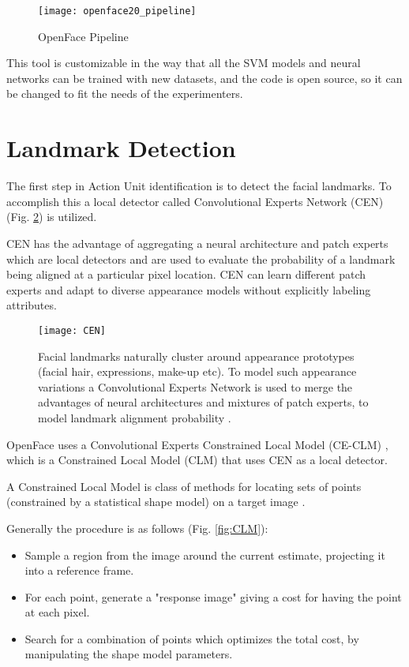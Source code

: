 \begin{figure}[H]
	\centering
	\texttt{[image: openface20\_pipeline]}
	\caption{OpenFace Pipeline \cite{Baltru2018}}
	\label{fig:openface20_pipeline}
\end{figure}

This tool is customizable in the way that all the SVM models and neural networks can be trained with new datasets, and the code is open source, so it can be changed to fit the needs of the experimenters.



\clearpage

\section{Landmark Detection} \label{landmark_det}

The first step in Action Unit identification is to detect the facial landmarks. To accomplish this a local detector called Convolutional Experts Network (CEN) (Fig. \ref{fig:CEN}) is utilized. 

CEN has the advantage of aggregating a neural architecture and patch experts which are local detectors and are used to evaluate the probability of a landmark being aligned at a particular pixel location. CEN can learn different patch experts and adapt to diverse appearance models without explicitly labeling attributes.

\begin{figure}[H]
	\centering
	\texttt{[image: CEN]}
	\caption{Facial landmarks naturally cluster around appearance prototypes (facial hair, expressions, make-up etc). To model such appearance variations a Convolutional Experts Network is used to merge the advantages of neural architectures and mixtures of patch experts, to model landmark alignment probability \cite{Baltru2017}.}
	\label{fig:CEN}
\end{figure}

OpenFace uses a Convolutional Experts Constrained Local Model (CE-CLM) \cite{Baltru2017}, which is a Constrained Local Model (CLM) that uses CEN as a local detector. 

A Constrained Local Model is class of methods for locating sets of points (constrained by a statistical shape model) on a target image \cite{clm_cootes}.

Generally the procedure is as follows (Fig. \ref{fig:CLM}):
\begin{itemize}[noitemsep]
	\item Sample a region from the image around the current estimate, projecting it into a reference frame.
	\item For each point, generate a "response image" giving a cost for having the point at each pixel.
	\item Search for a combination of points which optimizes the total cost, by manipulating the shape model parameters.
\end{itemize}

